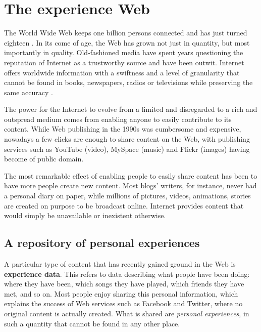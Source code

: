 \section{The experience Web} %
\label{sec:musical_experience_in_the_web}

The World Wide Web keeps one billion persons connected \cite{Comscore09} and has just turned eighteen \cite{BernersLee91}.
In its come of age, the Web has grown not just in quantity, %
but most importantly in quality.
Old-fashioned media have spent years questioning the reputation of Internet as a trustworthy source \cite{Johnson04} and have been outwit. 
Internet offers worldwide information with a swiftness and a level of granularity that cannot be found in books, newspapers, radios or televisions while preserving the same accuracy \cite{Giles05}.

The power for the Internet to evolve from a limited and disregarded to a rich and outspread medium comes from enabling anyone to easily contribute to its content.
While Web publishing in the 1990s was cumbersome and expensive, nowadays a few clicks are enough to share content on the Web, with publishing services such as YouTube (video), MySpace (music) and Flickr (images) having become of public domain.

The most remarkable effect of enabling people to easily share content has been to have more people create new content.
Most blogs' writers, for instance, never had a personal diary on paper, while millions of pictures, videos, animations, stories are created on purpose to be broadcast online.
Internet provides content that would simply be unavailable or inexistent otherwise.

\subsection{A repository of personal experiences} %
\label{sub:a_repository_of_personal_experiences}

A particular type of content that has recently gained ground in the Web is \textbf{experience data}. 
This refers to data describing what people have been doing: where they have been, which songs they have played, %
which friends they have met, and so on. Most people enjoy sharing this personal information, which explains the success of Web services such as Facebook and Twitter, where no original content is actually created.
What is shared are \emph{personal experiences}, in such a quantity that cannot be found in any other place.

